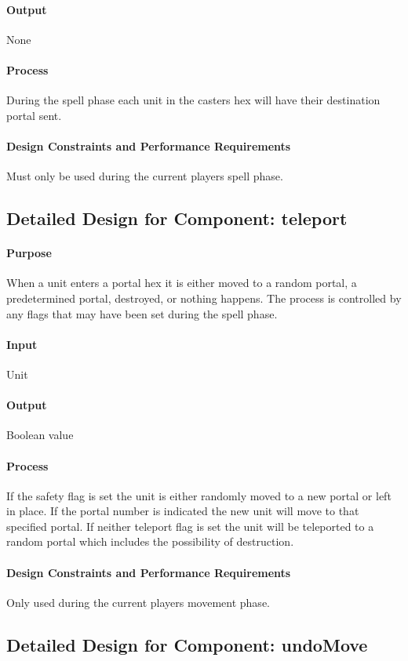 \documentclass[12pt,a4paper,titlepage]{article}
\begin{document}
\paragraph{Output} None
\paragraph{Process} During the spell phase each unit in the casters hex will have their destination portal sent.
\paragraph{Design Constraints and Performance Requirements} Must only be used during the current players spell phase.

\subsection{Detailed Design for Component: teleport}
\paragraph{Purpose} When a unit enters a portal hex it is either moved to a random portal, a predetermined portal, destroyed, or nothing happens. The process is controlled by any flags that may have been set during the spell phase.
\paragraph{Input} Unit
\paragraph{Output} Boolean value
\paragraph{Process} If the safety flag is set the unit is either randomly moved to a new portal or left in place. If the portal number is indicated the new unit will move to that specified portal. If neither teleport flag is set the unit will be teleported to a random portal which includes the possibility of destruction.
\paragraph{Design Constraints and Performance Requirements} Only used during the current players movement phase.

\subsection{Detailed Design for Component: undoMove}
\end{document}
